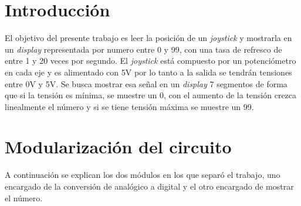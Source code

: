 \documentclass[11pt, a4paper]{article}
\begin{document}


\setcounter{tocdepth}{2}
\tableofcontents
\newpage
%
\section{Introducci\'on}
El objetivo del presente trabajo es leer la posici\'on de un \textit{joystick} y mostrarla en un \textit{display} representada por numero entre 0 y 99, con una tasa de refresco de entre 1 y 20 veces por segundo. El \textit{joystick} est\'a compuesto por un potenci\'ometro en cada eje y es alimentado con 5V por lo tanto a la salida se tendr\'an tensiones entre 0V y 5V. Se busca mostrar esa se\~nal en un \textit{display} 7 segmentos de forma que si la tensi\'on es m\'inima, se muestre un 0, con el aumento de la tensi\'on crezca linealmente el n\'umero y si se tiene tensi\'on m\'axima se muestre un 99.
\newpage

\section{Modularizaci\'on del circuito}
%
A continuaci\'on se explican los dos m\'odulos en los que separ\'o el trabajo, uno encargado de la conversi\'on de anal\'ogico a digital y el otro encargado de mostrar el n\'umero.
\end{document}
